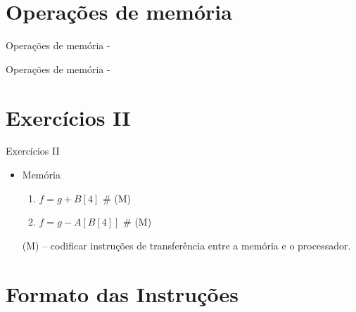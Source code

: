 

\section{Operações de memória}

\begin{frame}{Operações de memória - \only<2>{--MIPS}}{\em {}}
\end{frame}

\begin{frame}{Operações de memória - \only<2>{--MIPS}}{\em {}}

\end{frame}


\section{Exercícios II}

\def\mem{{\footnotesize\color{gray}\# (M)}}
\begin{frame}{Exercícios II}
  \large

\begin{itemize}
\item Memória
  \begin{enumerate}
  \item $f = g + B[4]$ \mem
  \item $ f = g - A[B[4]]$ \mem
  \end{enumerate}

  \bigskip
  {\footnotesize (M) -- codificar instruções de transferência entre a
    memória e o processador.}
  
\end{itemize}

\end{frame}


\section{Formato das Instruções}


